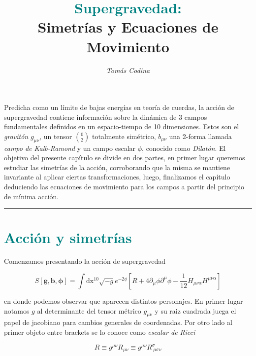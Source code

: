 \documentclass{article}
\title{\vspace{-35pt}\huge{\textbf{\textcolor{teal}{Supergravedad:}}} \\ \vspace{0.1cm} \large{\textbf{Simetrías y Ecuaciones de Movimiento}}}
\date{\vspace{-20pt}}
\author{\textit{Tomás Codina}}
\numberwithin{equation}{section}
\begin{document}
\maketitle
\thispagestyle{fancy}






Predicha como un límite de bajas energías en teoría de cuerdas, la acción de supergravedad contiene información sobre la dinámica de 3 campos fundamentales definidos en un espacio-tiempo de 10 dimensiones. Estos son el \textit{gravitón} $ g_{\mu\nu} $, un tensor $ \binom{0}{2} $ totalmente simétrico, $ b_{\mu\nu} $ una 2-forma llamada \textit{campo de Kalb-Ramond} y un campo escalar $ \phi $, conocido como \textit{Dilatón}. El objetivo del presente capítulo se divide en dos partes, en primer lugar queremos estudiar las simetrías de la acción, corroborando que la misma se mantiene invariante al aplicar ciertas transformaciones, luego, finalizamos el capítulo deduciendo las ecuaciones de movimiento para los campos a partir del principio de mínima acción.  

\rule{\textwidth}{0.4pt}

\section{\textcolor{teal}{Acción y simetrías}}\label{sim} %
 
Comenzamos presentando la acción de supergravedad 

\begin{equation}\label{S}
S[\textbf{g},\textbf{b},\pmb{\phi}]=\int\mathrm{dx^{10}} \sqrt{-g}e^{-2\phi}\left[R + 4 \partial_{\mu}\phi\partial^{\mu} \phi - \frac{1}{12} H_{\mu \nu \alpha}H^{\mu \nu \alpha}\right]  
\end{equation}

en donde podemos observar que aparecen distintos personajes. En primer lugar notamos $ g $ al determinante del tensor métrico $ g_{\mu\nu} $ y su raiz cuadrada juega el papel de jacobiano para cambios generales de coordenadas. Por otro lado al primer objeto entre brackets se lo conoce como \textit{escalar de Ricci} 

\begin{equation}\label{R}
R \equiv g^{\mu \nu}R_{\mu\nu} \equiv g^{\mu \nu}R^{\sigma}_{ \ \mu\sigma\nu}
\end{equation}
\end{document}
